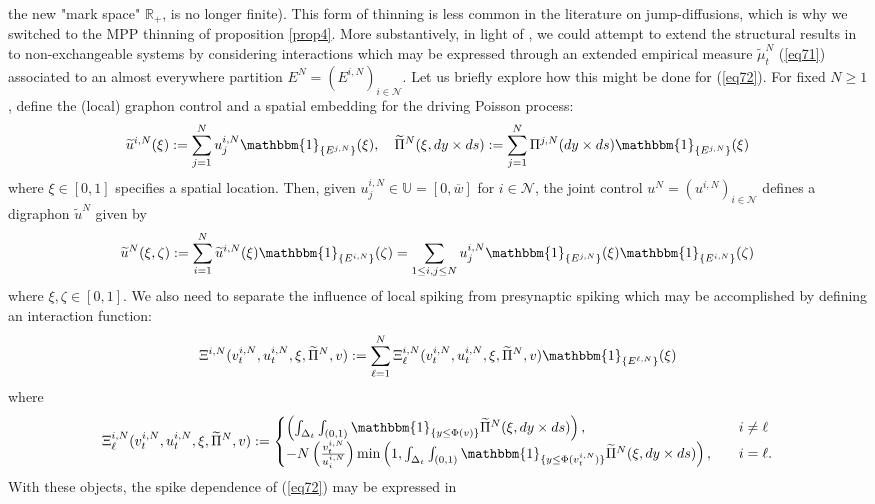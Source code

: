 \documentclass[12pt, oneside]{report}
\newcommand{\mbb}[1]{\mathbb{#1}}
\newcommand{\1}[1]{\mathbbm{1}_{\{#1\}}}
\newcommand{\mc}[1]{\mathcal{#1}}
\theoremstyle{definition}
\begin{document}
the new "mark space" $\mbb{R}_+$, is no longer finite). This form of thinning is
less common in the literature on jump-diffusions, which is why we switched to
the MPP thinning of proposition \ref{prop4}. More substantively, in light of
\cite{Jabin_Schmutz_Zhou_2024}, we could attempt to extend the structural
results in \cite{Sanjari_Saldi_Yüksel_2024} to non-exchangeable systems by
considering interactions which may be expressed through an extended empirical
measure $\tilde{\mu}^N_t$ (\ref{eq71}) associated to an almost everywhere
partition $E^N=(E^{i,N})_{i\in\mc{N}}$. Let us briefly explore how this might be
done for (\ref{eq72}). For fixed $N\geq 1$, define the (local) graphon control
and a spatial embedding for the driving Poisson process:
\begin{align}
    \widetilde{u}^{i,N}(\xi):=\sum_{j=1}^Nu^{i,N}_j\1{E^{j,N}}(\xi),\quad \widetilde{\Pi}^{N}(\xi,dy\times ds):=\sum_{j=1}^N\Pi^{j,N}(dy\times ds)\1{E^{j,N}}(\xi)
\end{align}
where $\xi\in[0,1]$ specifies a spatial location. Then, given
$u^{i,N}_j\in\mbb{U}=[0,\overline{w}]$ for $i\in\mc{N}$, the joint control
$u^N=(u^{i,N})_{i\in\mc{N}}$ defines a digraphon $\widetilde{u}^N$ given by
\begin{align}
    \widetilde{u}^N(\xi,\zeta):=\sum_{i=1}^N\widetilde{u}^{i,N}(\xi)\1{E^{i,N}}(\zeta)=\sum_{1\leq i,j\leq N}u^{i,N}_j\1{E^{j,N}}(\xi)\1{E^{i,N}}(\zeta)
\end{align}
where $\xi,\zeta\in[0,1]$. We also need to separate the influence of local
spiking from presynaptic spiking which may be accomplished by defining an
interaction function:
\begin{align}
    \Xi^{i,N}(v^{i,N}_t,u^{i,N}_t,\xi,\widetilde{\Pi}^N,v):=\sum_{\ell=1}^N\Xi^{i,N}_\ell(v^{i,N}_t,u^{i,N}_t,\xi,\widetilde{\Pi}^N,v)\1{E^{\ell,N}}(\xi)
\end{align}
where 
\begin{align}
    \Xi^{i,N}_\ell(v^{i,N}_t,u^{i,N}_t,\xi,\widetilde{\Pi}^N,v):=\begin{cases}
        \left(\int_{\Delta_t}\int_{(0,1)}\1{y\leq\Phi(v)}\widetilde{\Pi}^N(\xi,dy\times ds)\right),\quad& i\neq\ell\\
        -N\left(\frac{v^{i,N}_t}{u^{i,N}_i}\right)\min\left(1,\int_{\Delta_t}\int_{(0,1)}\1{y\leq\Phi(v^{i,N}_t)}\widetilde{\Pi}^N(\xi,dy\times ds)\right),\quad& i=\ell.
    \end{cases}\label{eq73}
\end{align}
With these objects, the spike dependence of (\ref{eq72}) may be expressed in
\end{document}
